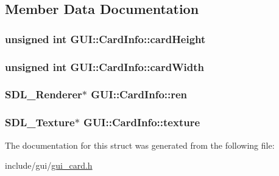 \subsection{Member Data Documentation}
\hypertarget{structGUI_1_1CardInfo_a17551b62ced18a32651d1dc46b8c8489}{
\subsubsection[{card\-Height}]{\setlength{\rightskip}{0pt plus 5cm}unsigned int G\-U\-I\-::\-Card\-Info\-::card\-Height}}\label{structGUI_1_1CardInfo_a17551b62ced18a32651d1dc46b8c8489}
\hypertarget{structGUI_1_1CardInfo_a61ab52dbaab60c9d44b67113ce4c4528}{
\subsubsection[{card\-Width}]{\setlength{\rightskip}{0pt plus 5cm}unsigned int G\-U\-I\-::\-Card\-Info\-::card\-Width}}\label{structGUI_1_1CardInfo_a61ab52dbaab60c9d44b67113ce4c4528}
\hypertarget{structGUI_1_1CardInfo_a6ee366c83b985779906ffd26adcbbd9d}{
\subsubsection[{ren}]{\setlength{\rightskip}{0pt plus 5cm}S\-D\-L\-\_\-\-Renderer$\ast$ G\-U\-I\-::\-Card\-Info\-::ren}}\label{structGUI_1_1CardInfo_a6ee366c83b985779906ffd26adcbbd9d}
\hypertarget{structGUI_1_1CardInfo_a9ea2f3c5d4bcf977d2ecc94b1dda4e1b}{
\subsubsection[{texture}]{\setlength{\rightskip}{0pt plus 5cm}S\-D\-L\-\_\-\-Texture$\ast$ G\-U\-I\-::\-Card\-Info\-::texture}}\label{structGUI_1_1CardInfo_a9ea2f3c5d4bcf977d2ecc94b1dda4e1b}


The documentation for this struct was generated from the following file\-:\begin{DoxyCompactItemize}
\item 
include/gui/\hyperlink{gui__card_8h}{gui\-\_\-card.\-h}\end{DoxyCompactItemize}
